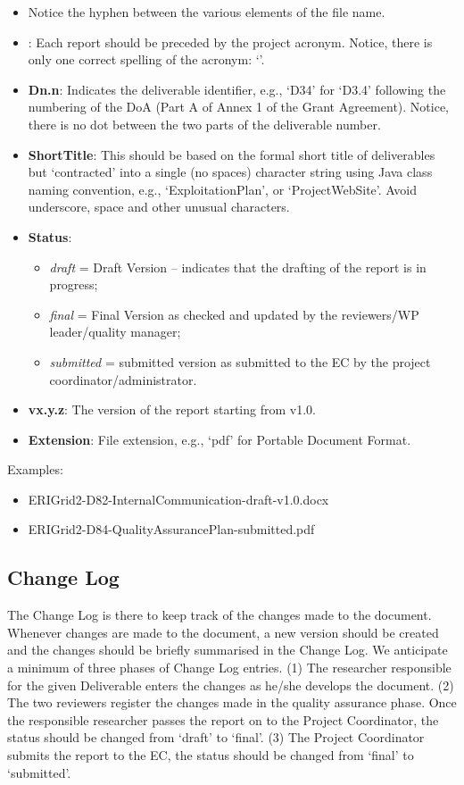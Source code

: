 \begin{itemize}
	\item Notice the hyphen between the various elements of the file name.
    \item {\bf \projacronym}: Each \projacronym{} report should be preceded by the project acronym. Notice, there is only one correct spelling of the acronym: ‘\projacronym’.
    \item {\bf Dn.n}: Indicates the deliverable identifier, e.g., ‘D34’ for ‘D3.4’ following the numbering of the \ac{DoA} (Part A of Annex 1 of the Grant Agreement). Notice, there is no dot between the two parts of the deliverable number.
    \item {\bf ShortTitle}: This should be based on the formal short title of deliverables but ‘contracted’ into a single (no spaces) character string using Java class naming convention, e.g., ‘ExploitationPlan’,  or ‘ProjectWebSite’. Avoid underscore, space and other unusual characters.
	\item {\bf Status}:
	\begin{itemize}
		\item \textit{draft} = Draft Version – indicates that the drafting of the report is in progress;
		\item \textit{final} = Final Version as checked and updated by the reviewers/WP leader/quality manager;
		\item \textit{submitted} = submitted version as submitted to the \ac{EC} by the project coordinator/administrator.
	\end{itemize}
	\item {\bf vx.y.z}: The version of the report starting from v1.0.
    \item {\bf Extension}: File extension, e.g., ‘pdf’ for Portable Document Format.
\end{itemize}

Examples:

\begin{itemize}
    \item ERIGrid2-D82-InternalCommunication-draft-v1.0.docx
    \item ERIGrid2-D84-QualityAssurancePlan-submitted.pdf
\end{itemize}

\subsection{Change Log}
\label{sec:change-log}

The Change Log is there to keep track of the changes made to the document. Whenever changes are made to the document, a new version should be created and the changes should be briefly summarised in the Change Log. We anticipate a minimum of three phases of Change Log entries. (1) The researcher responsible for the given Deliverable enters the changes as he/she develops the document. (2) The two reviewers register the changes made in the quality assurance phase. Once the responsible researcher passes the report on to the Project Coordinator, the status should be changed from ‘draft’ to ‘final’. (3) The Project Coordinator submits the report to the \ac{EC}, the status should be changed from ‘final’ to ‘submitted’.

